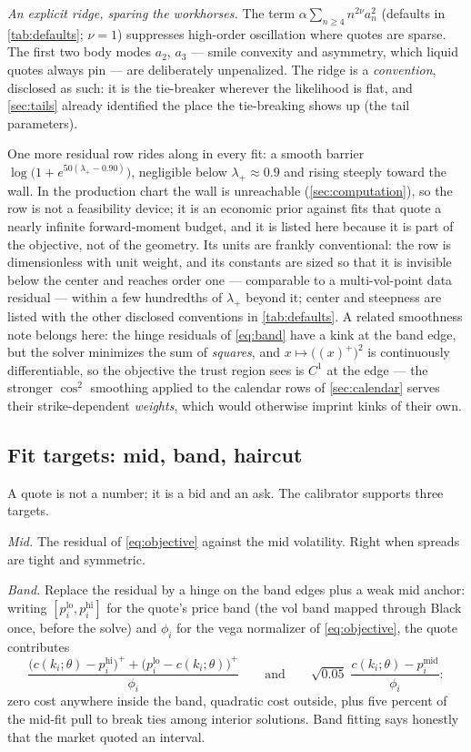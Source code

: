 \emph{An explicit ridge, sparing the workhorses.}  The term
$\alpha\sum_{n\ge4}n^{2\nu}a_n^{2}$ (defaults in \cref{tab:defaults};
$\nu=1$) suppresses high-order oscillation where quotes are sparse.  The
first two body modes $a_2$, $a_3$ --- smile convexity and asymmetry, which
liquid quotes always pin --- are deliberately unpenalized.  The ridge is a
\emph{convention}, disclosed as such: it is the tie-breaker wherever the
likelihood is flat, and \cref{sec:tails} already identified the place the
tie-breaking shows up (the tail parameters).

One more residual row rides along in every fit: a smooth barrier
$\log\big(1+e^{50(\lambda_+-0.90)}\big)$, negligible below
$\lambda_+\approx0.9$ and rising steeply toward the wall.  In the
production chart the wall is unreachable
(\cref{sec:computation}), so the row is not a feasibility device; it is an
economic prior against fits that quote a nearly infinite forward-moment
budget, and it is listed here because it is part of the objective, not of
the geometry.  Its units are frankly conventional: the row is
dimensionless with unit weight, and its constants are sized so that it
is invisible below the center and reaches order one --- comparable to a
multi-vol-point data residual --- within a few hundredths of $\lambda_+$
beyond it; center and steepness are listed with the other disclosed
conventions in \cref{tab:defaults}.  A related smoothness note belongs
here: the hinge residuals of \eqref{eq:band} have a kink at the band
edge, but the solver minimizes the sum of \emph{squares}, and
$x\mapsto\big((x)^{+}\big)^{2}$ is continuously differentiable, so the
objective the trust region sees is $C^{1}$ at the edge --- the stronger
$\cos^{2}$ smoothing applied to the calendar rows of \cref{sec:calendar}
serves their strike-dependent \emph{weights}, which would otherwise
imprint kinks of their own.

\subsection{Fit targets: mid, band, haircut}

A quote is not a number; it is a bid and an ask.  The calibrator supports
three targets.

\emph{Mid.}  The residual of \eqref{eq:objective} against the mid
volatility.  Right when spreads are tight and symmetric.

\emph{Band.}  Replace the residual by a hinge on the band edges plus a
weak mid anchor: writing $[p_i^{\mathrm{lo}},p_i^{\mathrm{hi}}]$ for the
quote's price band (the vol band mapped through Black once, before the
solve) and $\phi_i$ for the vega normalizer of \eqref{eq:objective}, the
quote contributes
\begin{equation}
\frac{\big(c(k_i;\theta)-p_i^{\mathrm{hi}}\big)^{+}
+\big(p_i^{\mathrm{lo}}-c(k_i;\theta)\big)^{+}}{\phi_i}
\qquad\text{and}\qquad
\sqrt{0.05}\;\frac{c(k_i;\theta)-p_i^{\mathrm{mid}}}{\phi_i} :
\label{eq:band}
\end{equation}
zero cost anywhere inside the band, quadratic cost outside, plus five
percent of the mid-fit pull to break ties among interior solutions.  Band
fitting says honestly that the market quoted an interval.

